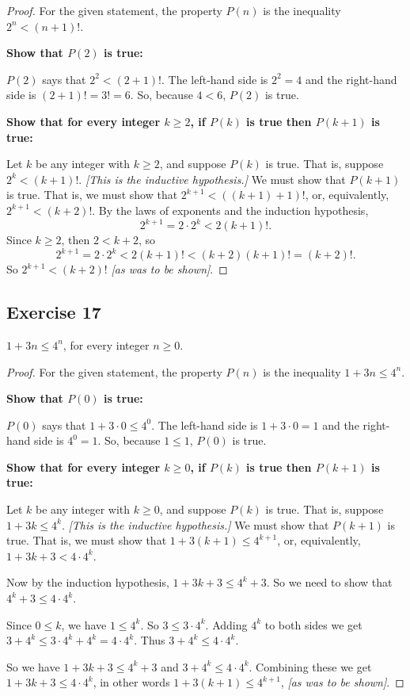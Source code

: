 \documentclass[14pt]{extarticle}
\begin{document}
\begin{proof}
    For the given statement, the property $P(n)$ is the inequality $2^n < (n + 1)!$.

        {\bf Show that $P(2)$ is true:}

    $P(2)$ says that $2^2 < (2 + 1)!$. The left-hand side is $2^2 = 4$ and the right-hand side is $(2+1)! = 3! = 6$. So, because $4 < 6$, $P(2)$ is true.

        {\bf Show that for every integer $k \geq 2$, if $P(k)$ is true then $P(k + 1)$ is true:}

    Let $k$ be any integer with $k \geq 2$, and suppose $P(k)$ is true. That is, suppose $2^k < (k + 1)!$. {\it [This is the inductive hypothesis.]} We must show that $P(k + 1)$ is true. That is, we must show that $2^{k+1} < ((k+1) + 1)!$, or, equivalently, $2^{k+1} < (k + 2)!$. By the laws of exponents and the induction hypothesis,
    \[
        2^{k+1} = 2 \cdot 2^k < 2(k+1)!.
    \]
    Since $k \geq 2$, then $2 < k+2$, so
    \[
        2^{k+1} = 2 \cdot 2^k < 2(k+1)! < (k+2)(k+1)! = (k+2)!.
    \]
    So $2^{k+1} < (k+2)!$ {\it [as was to be shown]}.
\end{proof}

\subsection{Exercise 17}
$1 + 3n \leq 4^n$, for every integer $n \geq 0$.

\begin{proof}
    For the given statement, the property $P(n)$ is the inequality $1 + 3n \leq 4^n$.

        {\bf Show that $P(0)$ is true:}

    $P(0)$ says that $1 + 3 \cdot 0 \leq 4^0$. The left-hand side is $1 + 3 \cdot 0 = 1$ and the right-hand side is $4^0 = 1$. So, because $1 \leq 1$, $P(0)$ is true.

        {\bf Show that for every integer $k \geq 0$, if $P(k)$ is true then $P(k + 1)$ is true:}

    Let $k$ be any integer with $k \geq 0$, and suppose $P(k)$ is true. That is, suppose $1 + 3k \leq 4^k$. {\it [This is the inductive hypothesis.]} We must show that $P(k + 1)$ is true. That is, we must show that $1 + 3(k+1) \leq 4^{k+1}$, or, equivalently, $1+3k+3 < 4 \cdot 4^k$.

    Now by the induction hypothesis, $1 + 3k + 3 \leq 4^k + 3$. So we need to show that $4^k + 3 \leq 4 \cdot 4^k$.

    Since $0 \leq k$, we have $1 \leq 4^k$. So $3 \leq 3 \cdot 4^k$. Adding $4^k$ to both sides we get $3 + 4^k \leq 3 \cdot 4^k + 4^k = 4 \cdot 4^k$. Thus $3 + 4^k \leq 4 \cdot 4^k$.

    So we have $1 + 3k + 3 \leq 4^k + 3$ and $3 + 4^k \leq 4 \cdot 4^k$. Combining these we get $1 + 3k + 3 \leq 4 \cdot 4^k$, in other words $1 + 3(k+1) \leq 4^{k+1}$, {\it [as was to be shown]}.
\end{proof}
\end{document}
